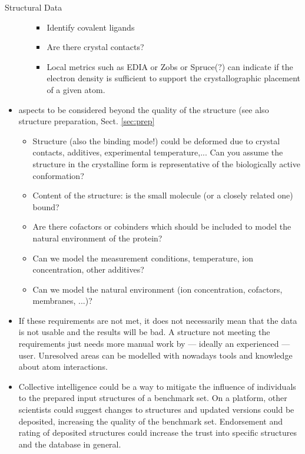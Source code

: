 \documentclass[9pt,bestpractices]{livecoms}
\begin{document}
\begin{Checklists*}[p!]
\begin{checklist}{Structural Data}
\begin{itemize}
\begin{itemize}
\begin{itemize}
        \item Identify covalent ligands
        \item Are there crystal contacts? 
        \item  Local metrics such as EDIA or Zobs or Spruce(?) can indicate if the electron density is sufficient to support the crystallographic placement of a given atom.
        \end{itemize}
    \end{itemize}
\item aspects to be considered beyond the quality of the structure (see also structure preparation, Sect. \ref{sec:prep}
    \begin{itemize}
    \item Structure (also the binding mode!) could be deformed due to crystal contacts, additives, experimental temperature,... Can you assume the structure in the crystalline form is representative of the biologically active conformation? 
    \item Content of the structure: is the small molecule (or a closely related one) bound? 
    \item Are there cofactors or cobinders which should be included to model the natural environment of the protein?
    \item Can we model the measurement conditions, temperature, ion concentration, other additives?
    \item Can we model the natural environment (ion concentration, cofactors, membranes, ...)?
    \end{itemize}
\item If these requirements are not met, it does not necessarily mean that the data is not usable and  the results will be bad. A structure not meeting the requirements just needs more manual work by --- ideally an experienced --- user. Unresolved areas can be modelled with nowadays tools and knowledge about atom interactions.
\item Collective intelligence could be a way to mitigate the influence of individuals to the prepared input structures of a benchmark set. On a platform, other scientists could suggest changes to structures and updated versions could be deposited, increasing the quality of the benchmark set. Endorsement and rating of deposited structures could increase the trust into specific structures and the database in general. 
\end{itemize}
\end{checklist}

\end{Checklists*}
\end{document}
